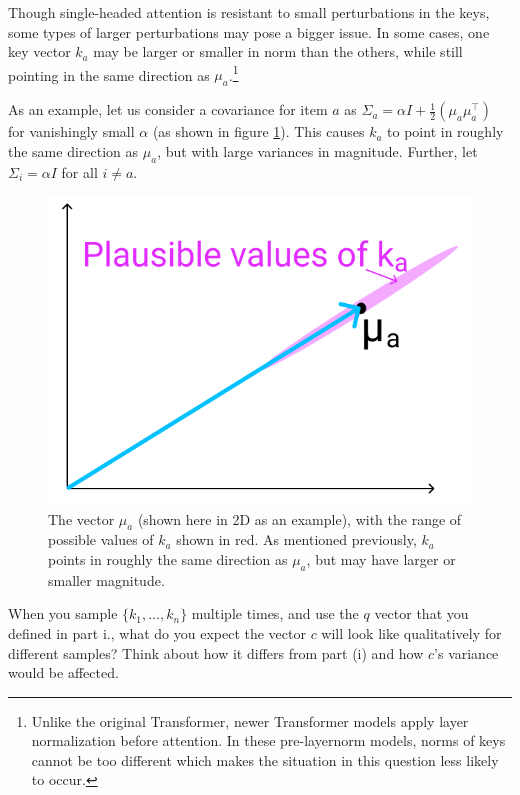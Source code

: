 \begin{parts}
\begin{subparts}
\subpart[3] Though single-headed attention is resistant to small perturbations in the keys, some types of larger perturbations may pose a bigger issue. In some cases, one key vector $k_a$ may be larger or smaller in norm than the others, while still pointing in the same direction as $\mu_a$.\footnote{Unlike the original Transformer, newer Transformer models apply layer normalization before attention. In these pre-layernorm models, norms of keys cannot be too different which makes the situation in this question less likely to occur.}

As an example, let us consider a covariance for item $a$ as $\Sigma_a = \alpha I + \frac{1}{2}(\mu_a\mu_a^\top)$ for vanishingly small $\alpha$ (as shown in figure \ref{ka_plausible}). This causes $k_a$ to point in roughly the same direction as $\mu_a$, but with large variances in magnitude. Further, let $\Sigma_i = \alpha I$ for all $i \neq a$.
\begin{figure}[h]
\centering
\captionsetup{justification=centering,margin=2cm}
\includegraphics[width=0.35\linewidth]{images/ka_plausible.png}
\caption{The vector $\mu_a$ (shown here in 2D as an example), with the range of possible values of $k_a$ shown in red. As mentioned previously, $k_a$ points in roughly the same direction as $\mu_a$, but may have larger or smaller magnitude.}
\label{ka_plausible}
\end{figure}

When you sample $\{k_1,\dots,k_n\}$ multiple times, and use the $q$ vector that you defined in part i., what do you expect the vector $c$ will look like qualitatively for different samples? Think about how it differs from part (i) and how $c$'s variance would be affected.


\end{subparts}
\end{parts}
